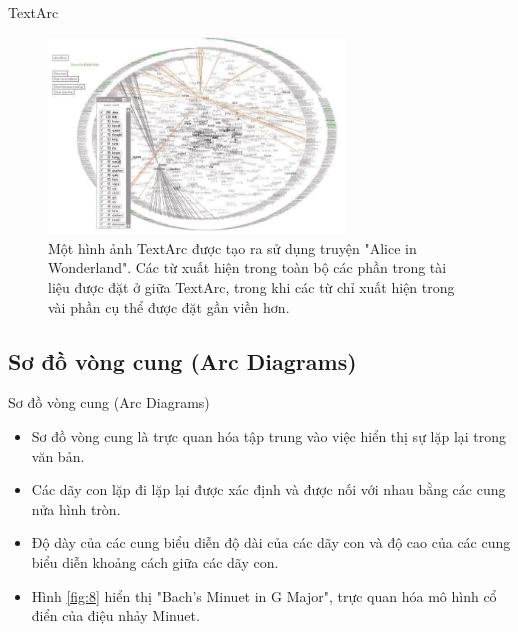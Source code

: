 \documentclass[10pt]{beamer}
\theoremstyle{remark}
\theoremstyle{definition}
\begin{document}
\begin{frame}{TextArc}
	\begin{figure}[h!]
        \centering
        \includegraphics[width=0.7\textwidth]{7.png}
        \caption{Một hình ảnh TextArc được tạo ra sử dụng truyện "Alice in Wonderland".
        Các từ xuất hiện trong toàn bộ các phần trong tài liệu được đặt ở giữa TextArc, trong khi các từ chỉ xuất hiện trong vài phần cụ thể được đặt gần viền hơn.}
        \label{fig:7}
    \end{figure}
\end{frame}

\subsection{Sơ đồ vòng cung (Arc Diagrams)}

\begin{frame}{Sơ đồ vòng cung (Arc Diagrams)}
	\begin{itemize}
		\item Sơ đồ vòng cung là trực quan hóa tập trung vào việc hiển thị sự lặp lại trong văn bản.
		\item Các dãy con lặp đi lặp lại được xác định và được nối với nhau bằng các cung nửa hình tròn.
		\item Độ dày của các cung biểu diễn độ dài của các dãy con và độ cao của các cung biểu diễn khoảng cách giữa các dãy con.
		\item Hình \ref{fig:8} hiển thị "Bach’s Minuet in G Major", trực quan hóa mô hình cổ điển của điệu nhảy Minuet.
	\end{itemize}
\end{frame}
\end{document}

